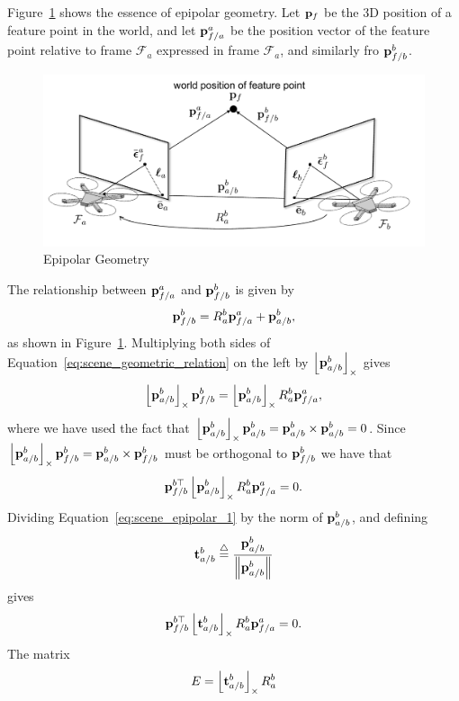 Figure~\ref{fig:epipolar_geometry} shows the essence of epipolar geometry.  
Let $\mathbf{p}_f$ be the 3D position of a feature point in the world, and let $\mathbf{p}_{f/a}^a$ be the position vector of the feature point relative to frame $\mathcal{F}_a$ expressed in frame $\mathcal{F}_a$, and similarly fro $\mathbf{p}_{f/b}^b$.
	\begin{figure}
		\includegraphics[width=\linewidth]{chap8_scene_reconstruction/figures/epipolar_geometry_quad}
		\caption{Epipolar Geometry}
		\label{fig:epipolar_geometry}
	\end{figure}
The relationship between $\mathbf{p}_{f/a}^a$ and $\mathbf{p}_{f/b}^b$ is given by
\begin{equation}\label{eq:scene_geometric_relation}
\pbf_{f/b}^b = R_a^b \pbf_{f/a}^a + \pbf_{a/b}^b,
\end{equation}
as shown in Figure~\ref{fig:epipolar_geometry}.  Multiplying both sides of  Equation~\eqref{eq:scene_geometric_relation} on the left by $\left\lfloor\mathbf{p}_{a/b}^b\right\rfloor_{\times}$ gives
\[
\left\lfloor\mathbf{p}_{a/b}^b\right\rfloor_{\times} \mathbf{p}_{f/b}^b = \left\lfloor\mathbf{p}_{a/b}^b\right\rfloor_{\times} R_a^b \mathbf{p}_{f/a}^a,
\]
where we have used the fact that $\left\lfloor\mathbf{p}_{a/b}^b\right\rfloor_{\times}\mathbf{p}_{a/b}^b = \mathbf{p}_{a/b}^b \times \mathbf{p}_{a/b}^b = 0$. Since $\left\lfloor\mathbf{p}_{a/b}^b\right\rfloor_{\times} \mathbf{p}_{f/b}^b = \mathbf{p}_{a/b}^b \times \mathbf{p}_{f/b}^b$ must be orthogonal to $\mathbf{p}_{f/b}^b$ we have that 
\begin{equation}\label{eq:scene_epipolar_1}
\pbf_{f/b}^{b\top} \ss{\pbf_{a/b}^b} R_a^b \pbf_{f/a}^a = 0.
\end{equation}
Dividing Equation~\eqref{eq:scene_epipolar_1} by the norm of $\mathbf{p}_{a/b}^b$, and defining
\[
\mathbf{t}_{a/b}^b\stackrel{\triangle}{=} \frac{\mathbf{p}_{a/b}^b}{\left\|\mathbf{p}_{a/b}^b\right\|}
\]
gives
\begin{equation}\label{eq:scene_epipolar_2}
\pbf_{f/b}^{b\top} \ss{\tbf_{a/b}^b} R_a^b \pbf_{f/a}^a = 0.
\end{equation}
The matrix 
\begin{equation}\label{eq:scene_essential_matrix}
E = \ss{\tbf_{a/b}^b} R_a^b
\end{equation}
